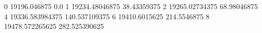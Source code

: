 0 19196.046875 0.0
1 19234.48046875 38.43359375
2 19265.02734375 68.98046875
4 19336.583984375 140.537109375
6 19410.6015625 214.5546875
8 19478.572265625 282.525390625
